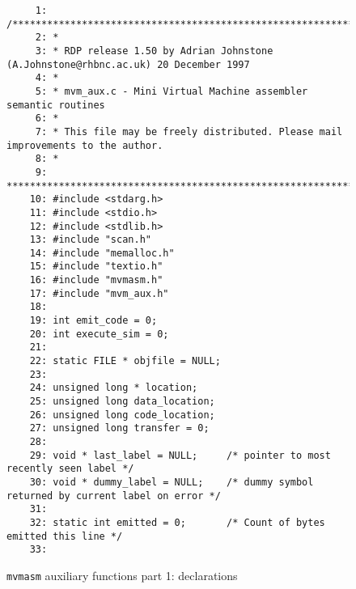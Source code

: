\begin{figure}
\hspace*{-1cm}
\begin{minipage}{30cm}
\footnotesize
\begin{verbatim}
     1: /*******************************************************************************
     2: *
     3: * RDP release 1.50 by Adrian Johnstone (A.Johnstone@rhbnc.ac.uk) 20 December 1997
     4: *
     5: * mvm_aux.c - Mini Virtual Machine assembler semantic routines
     6: *
     7: * This file may be freely distributed. Please mail improvements to the author.
     8: *
     9: *******************************************************************************/
    10: #include <stdarg.h>
    11: #include <stdio.h>
    12: #include <stdlib.h>
    13: #include "scan.h"
    14: #include "memalloc.h"
    15: #include "textio.h"
    16: #include "mvmasm.h"
    17: #include "mvm_aux.h"
    18: 
    19: int emit_code = 0; 
    20: int execute_sim = 0; 
    21:
    22: static FILE * objfile = NULL; 
    23: 
    24: unsigned long * location; 
    25: unsigned long data_location; 
    26: unsigned long code_location;
    27: unsigned long transfer = 0; 
    28: 
    29: void * last_label = NULL;     /* pointer to most recently seen label */
    30: void * dummy_label = NULL;    /* dummy symbol returned by current label on error */
    31: 
    32: static int emitted = 0;       /* Count of bytes emitted this line */
    33: 
\end{verbatim}
\end{minipage}
\caption{{\tt mvmasm} auxiliary functions part 1: declarations}
\label{mvm_aux.c:1}
\end{figure}
